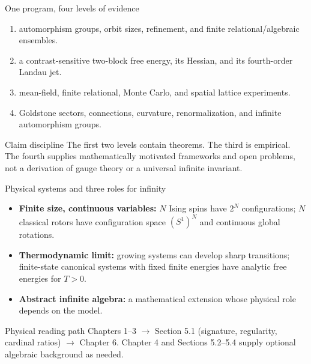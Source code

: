 \begin{frame}{One program, four levels of evidence}
  \begin{enumerate}
    \item {} automorphism groups, orbit sizes,
      refinement, and finite relational/algebraic ensembles.
    \item {} a contrast-sensitive two-block free
      energy, its Hessian, and its fourth-order Landau jet.
    \item {} mean-field, finite relational, Monte
      Carlo, and spatial lattice experiments.
    \item {} Goldstone sectors, connections,
      curvature, renormalization, and infinite automorphism groups.
  \end{enumerate}

  \vspace{0.5em}
  \begin{block}{Claim discipline}
    The first two levels contain theorems. The third is empirical. The fourth
    supplies mathematically motivated frameworks and open problems, not a
    derivation of gauge theory or a universal infinite invariant.
  \end{block}
\end{frame}

\begin{frame}{Physical systems and three roles for infinity}
  \begin{itemize}
    \item \textbf{Finite size, continuous variables:}
      $N$ Ising spins have $2^N$ configurations; $N$ classical rotors have
      configuration space $(S^1)^N$ and continuous global rotations.
    \item \textbf{Thermodynamic limit:}
      growing systems can develop sharp transitions; finite-state canonical
      systems with fixed finite energies have analytic free energies for $T>0$.
    \item \textbf{Abstract infinite algebra:}
      a mathematical extension whose physical role depends on the model.
  \end{itemize}
  \begin{block}{Physical reading path}
    Chapters 1--3 $\to$ Section 5.1 (signature, regularity, cardinal ratios)
    $\to$ Chapter 6. Chapter 4 and Sections 5.2--5.4 supply optional algebraic
    background as needed.
  \end{block}
\end{frame}

